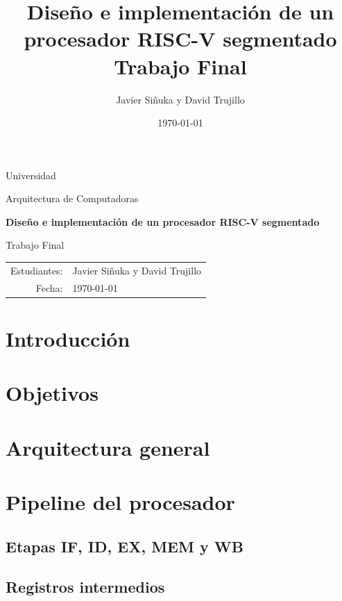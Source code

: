 \documentclass[11pt,a4paper]{article}
\title{\textbf{Diseño e implementación de un procesador RISC-V segmentado}\\[0.4em]
       \large Trabajo Final}
\author{Javier Siñuka y David Trujillo}
\date{\today}
\begin{document}
\begin{titlepage}
  \hypersetup{pageanchor=false}
  \centering
  \vspace*{1.2cm}
  {\Large Universidad \par}
  \vspace{0.3cm}
  {\large Arquitectura de Computadoras \par}
  \vspace{2.2cm}
  {\LARGE\bfseries Diseño e implementación de un procesador RISC-V segmentado\par}
  \vspace{0.5cm}
  {\large Trabajo Final\par}
  \vfill
  \begin{tabular}{rl}
    Estudiantes: & Javier Siñuka y David Trujillo \\
    Fecha: & \today
  \end{tabular}
  \vfill
\end{titlepage}

\hypersetup{pageanchor=true}
\clearpage
{}
\tableofcontents
\clearpage
{}

\begin{abstract}
\end{abstract}

\section{Introducción}

\section{Objetivos}

\section{Arquitectura general}

\section{Pipeline del procesador}

\subsection{Etapas IF, ID, EX, MEM y WB}

\subsection{Registros intermedios}
\end{document}
